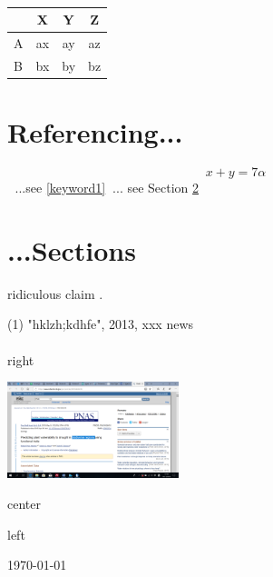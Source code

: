 \documentclass[pt11,a4paper]{book}
\begin{document}
\paragraph{}

\begin{table}[h]
  \centering  
  \begin{tabular}{ l | c c c }    
      	&  X  &  Y  & Z\\   
    \hline    
    A	&  ax  & ay  & az\\ 
    B	&  bx  & by  & bz
  \end{tabular}  
\end{table}

\paragraph{}

\section{Referencing...}

\begin{equation}
x+y=7\alpha
\label{keyword1}
\end{equation}

...see \eqref{keyword1}... see Section \ref{sections}

\section{...Sections}\label{sections}


ridiculous claim \cite{fakenews}.
\begin{thebibliography}(1)
"hklzh;kdhfe", 2013, xxx news

\end{thebibliography}

\paragraph{}

\begin{titlepage}

\begin{flushright}
right
\end{flushright}

\vspace{5cm}
\includegraphics[width=5cm]{Capture001.png}

\begin{center}
center
\end{center}

\begin{flushleft}
left
\end{flushleft}

\end{titlepage}

\today

\paragraph{}
\end{document}
